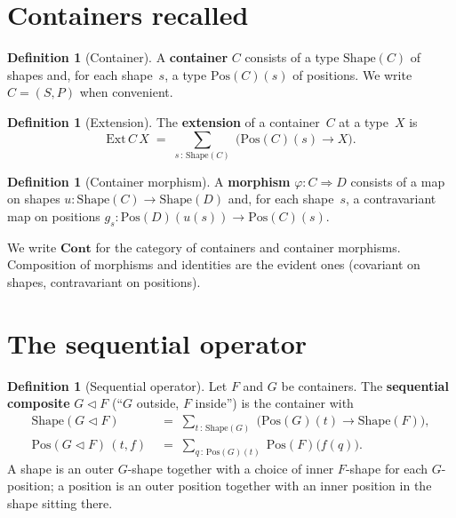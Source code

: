 \documentclass[11pt,a4paper]{article}
\theoremstyle{plain}
\theoremstyle{definition}
\newtheorem{definition}[theorem]{Definition}
\newcommand{\Ext}{\mathrm{Ext}}
\newcommand{\Shape}{\mathrm{Shape}}
\newcommand{\Pos}{\mathrm{Pos}}
\newcommand{\Cont}{\mathbf{Cont}}
\newcommand{\seqop}{\mathbin{\triangleleft}}
\begin{document}
\section{Containers recalled}

\begin{definition}[Container]\label{def:container}
A \textbf{container} $C$ consists of a type $\Shape(C)$ of shapes and,
for each shape~$s$, a type $\Pos(C)(s)$ of positions. We write
$C = (S, P)$ when convenient.
\end{definition}

\begin{definition}[Extension]\label{def:ext}
The \textbf{extension} of a container~$C$ at a type~$X$ is
\begin{equation}
  \Ext\,C\,X \;=\; \sum_{s \,:\, \Shape(C)}\;
  \bigl(\Pos(C)(s) \to X\bigr).
\end{equation}
\end{definition}

\begin{definition}[Container morphism]\label{def:morphism}
A \textbf{morphism} $\varphi : C \Rightarrow D$ consists of a map on
shapes $u : \Shape(C) \to \Shape(D)$ and, for each shape~$s$, a
contravariant map on positions
$g_s : \Pos(D)(u(s)) \to \Pos(C)(s)$.
\end{definition}

We write $\Cont$ for the category of containers and container morphisms.
Composition of morphisms and identities are the evident ones
(covariant on shapes, contravariant on positions).

\section{The sequential operator}

\begin{definition}[Sequential operator]\label{def:seq}
Let $F$ and $G$ be containers. The \textbf{sequential composite}
$G \seqop F$ (``$G$ outside, $F$ inside'') is the container with
\begin{align}
  \Shape(G \seqop F)
  &\;=\;
  \sum_{t \,:\, \Shape(G)}\;
  \bigl(\Pos(G)(t) \to \Shape(F)\bigr), \\[4pt]
  \Pos(G \seqop F)\,(t, f)
  &\;=\;
  \sum_{q \,:\, \Pos(G)(t)}\;
  \Pos(F)\bigl(f(q)\bigr).
\end{align}
A shape is an outer $G$-shape together with a choice of inner $F$-shape
for each $G$-position; a position is an outer position together with an
inner position in the shape sitting there.
\end{definition}
\end{document}
